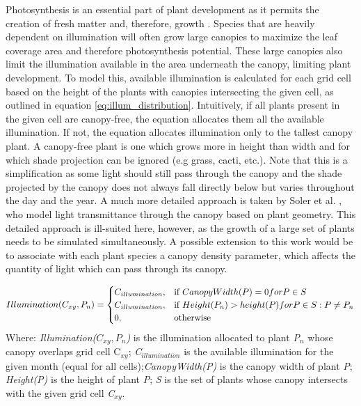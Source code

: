 Photosynthesis is an essential part of plant development as it permits the creation of fresh matter and, therefore, growth \cite{Soler2001}. Species that are heavily dependent on illumination will often grow large canopies to maximize the leaf coverage area and therefore photosynthesis potential. These large canopies also limit the illumination available in the area underneath the canopy, limiting plant development. To model this, available illumination is calculated for each grid cell based on the height of the plants with canopies intersecting the given cell, as outlined in equation \ref{eq:illum_distribution}. Intuitively, if all plants present in the given cell are canopy-free, the equation allocates them all the available illumination. If not, the equation allocates illumination only to the tallest canopy plant. A canopy-free plant is one which grows more in height than width and for which shade projection can be ignored (e.g grass, cacti, etc.). Note that this is a simplification as some light should still pass through the canopy and the shade projected by the canopy does not always fall directly below but varies throughout the day and the year. A much more detailed approach is taken by Soler et al. \cite{Soler2001}, who model light transmittance through the canopy based on plant geometry. This detailed approach is ill-suited here, however, as the growth of a large set of plants needs to be simulated simultaneously. A possible extension to this work would be to associate with each plant species a canopy density parameter, which affects the quantity of light which can pass through its canopy.

\begin{equation}
\centering
Illumination(C_{xy}, P_{n}) = 
\begin{cases}
	C_{illumination}, & \text{if } CanopyWidth(P) = 0 for P \in S \\
	C_{illumination}, & \text{if } Height(P_{n}) > height(P) for P \in S : P \neq P_{n} \\
    0,              & \text{otherwise}
\end{cases}
\label{eq:illum_distribution}
\end{equation}
Where: \textit{Illumination($C_{xy},P_{n}$)} is the illumination allocated to plant \textit{P$_{n}$} whose canopy overlaps grid cell C$_{xy}$; \textit{C$_{illumination}$} is the available illumination for the given month (equal for all cells);\textit{CanopyWidth(P)} is the canopy width of plant \textit{P}; \textit{Height(P)} is the height of plant \textit{P}; \textit{S} is the set of plants whose canopy intersects with the given grid cell \textit{C$_{xy}$}.\\

